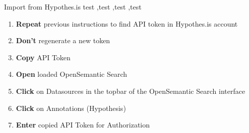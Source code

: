 \documentclass[10pt,a4paper]{article}
\begin{document}
\begin{textbox}{Import from Hypothes.is}
test  \sep test \sep test \sep test


\bigskip

\begin{enumerate}
\item \textbf{Repeat} previous instructions to find API token in Hypothes.is account 
\item \textbf{Don't} regenerate a new token
\item \textbf{Copy} API Token
\item \textbf{Open} loaded OpenSemantic Search
\item \textbf{Click} on Datasources in the topbar of the OpenSemantic Search interface
\item \textbf{Click} on Annotations (Hypothesis)
\item \textbf{Enter} copied API Token for Authorization
\end{enumerate}


\end{textbox}
\end{document}
